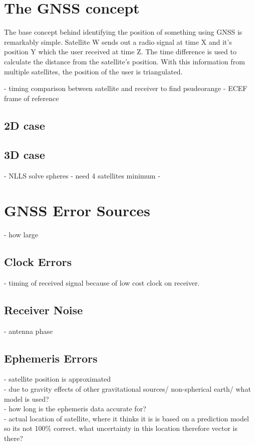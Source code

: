 
\section{The GNSS concept}
The base concept behind identifying the position of something using GNSS is remarkably simple. Satellite W sends out a radio signal at time X and it's position Y which the user received at time Z. The time difference is used to calculate the distance from the satellite's position. With this information from multiple satellites, the position of the user is triangulated. 


- timing comparison between satellite and receiver to find psudeorange
- ECEF frame of reference
\subsection{2D case}
\subsection{3D case}
- NLLS solve spheres
- need 4 satellites minimum
- 


\section{GNSS Error Sources}
- how large
\subsection{Clock Errors}
- timing of received signal because of low cost clock on receiver. 
\subsection{Receiver Noise}
- antenna phase
\subsection{Ephemeris Errors}
- satellite position is approximated\\
- due to gravity effects of other gravitational sources/ non-spherical earth/ what model is used?\\
- how long is the ephemeris data accurate for?\\
- actual location of satellite, where it thinks it is is based on a prediction model so its not 100\% correct. what uncertainty in this location therefore vector is there?

